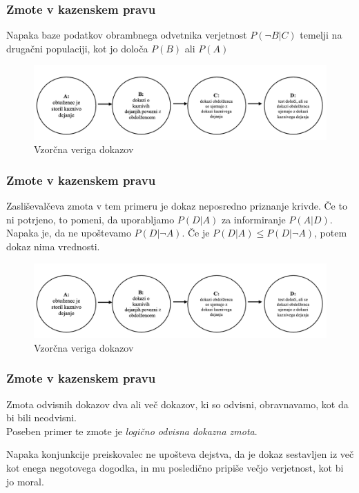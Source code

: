 \documentclass{beamer}
\begin{document}
\begin{frame}
    \frametitle{Zmote v kazenskem pravu}
    \begin{block}{Napaka baze podatkov obrambnega odvetnika}
        verjetnost $P(\neg B \lvert C)$ temelji na drugačni populaciji, kot jo določa $P(B)$ ali $P(A)$    
    \end{block}
    \begin{figure}[!ht]\label{fig:slika_3}
        \centering
        \includegraphics[scale=0.50]{slika_3.png}
        \caption{Vzorčna veriga dokazov}
    \end{figure}
\end{frame}

\begin{frame}
    \frametitle{Zmote v kazenskem pravu}
    \begin{block}{Zasliševalčeva zmota}
        v tem primeru je dokaz neposredno priznanje krivde. Če to ni potrjeno, to pomeni, da uporabljamo $P(D \lvert A)$ za
        informiranje $P(A \lvert D)$. Napaka je, da ne upoštevamo $P(D \lvert \neg A)$. Če je $P(D \lvert A) \leq P(D \lvert \neg A)$, potem dokaz
        nima vrednosti.    
    \end{block}
    \begin{figure}[!ht]\label{fig:slika_3}
        \centering
        \includegraphics[scale=0.40]{slika_3.png}
        \caption{Vzorčna veriga dokazov}
    \end{figure}
\end{frame}

\begin{frame}
    \frametitle{Zmote v kazenskem pravu}
    \begin{block}{Zmota odvisnih dokazov}
        dva ali več dokazov, ki so odvisni, obravnavamo, kot da bi bili neodvisni. \\
        Poseben primer te zmote je \textit{logično odvisna dokazna zmota}.\\ \vspace{2mm}
    \end{block} \vspace{2mm}
    \begin{block}{Napaka konjunkcije}
        preiskovalec ne upošteva dejstva, da je dokaz sestavljen iz več kot enega negotovega dogodka, in mu posledično pripiše večjo verjetnost, kot bi jo moral.
    \end{block}
\end{frame}
\end{document}
